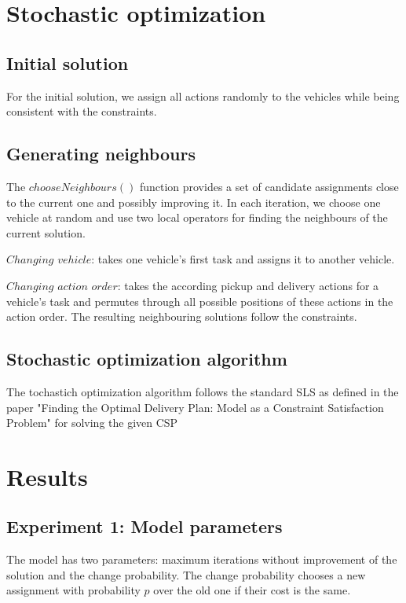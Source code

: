 \documentclass[11pt]{article}
\begin{document}
\section{Stochastic optimization}

\subsection{Initial solution}
For the initial solution, we assign all actions randomly to the vehicles while being consistent with the constraints. 

\subsection{Generating neighbours}
The $chooseNeighbours()$ function provides a set of candidate assignments close to the current one and possibly improving it. 
In each iteration, we choose one vehicle at random and use two local operators for finding the neighbours of the current solution.
\begin{description}
	\item $Changing$ $vehicle$: takes one vehicle's first task and assigns it to another vehicle.

	\item $Changing$ $action$ $order$: takes the according pickup and delivery actions for a vehicle's task and permutes through all possible positions of these actions in the action order. The resulting neighbouring solutions follow the constraints.
\end {description}

\subsection{Stochastic optimization algorithm}
The tochastich optimization algorithm follows the standard SLS as defined in the paper "Finding the Optimal Delivery Plan: Model as a Constraint Satisfaction Problem"
for solving the given CSP


\section{Results}

\subsection{Experiment 1: Model parameters}
The model has two parameters: maximum iterations without improvement of the solution and the change probability. The change probability  chooses a new assignment with probability $p$ over the old one if their cost is the same.
\end{document}
